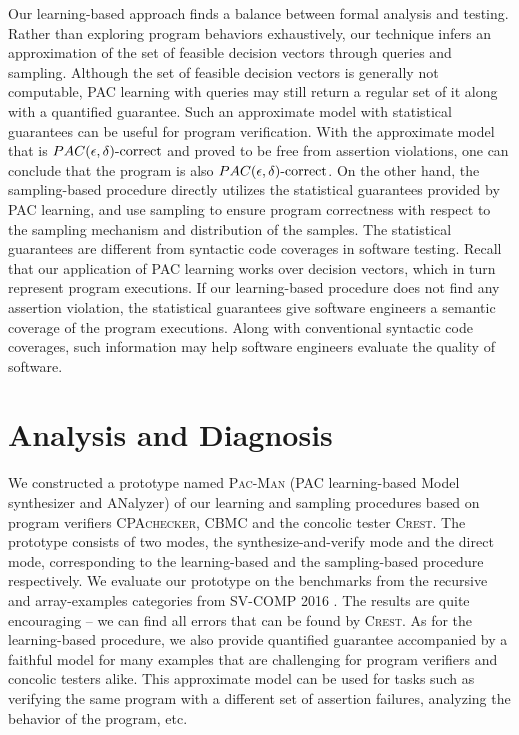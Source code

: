 Our learning-based approach finds a balance between formal analysis and testing. Rather than exploring program behaviors exhaustively, our technique infers an approximation of the set of feasible decision vectors through queries and sampling. Although the set of feasible decision vectors is generally not computable, PAC learning with queries may still return a regular set of it along with a quantified guarantee. Such an approximate model with statistical guarantees can be useful for program verification. With the approximate model that is $PAC(\epsilon, \delta)\text{-correct}$ and proved to be free from assertion violations, one can conclude that the program is also $PAC(\epsilon, \delta)\text{-correct}$. On the other hand, the sampling-based procedure directly utilizes the statistical guarantees provided by PAC learning, and use sampling to ensure program correctness with respect to the sampling mechanism and distribution of the samples. The statistical guarantees are different from syntactic code coverages in software testing. Recall that our application of PAC learning works over decision vectors, which in turn represent program executions. If our learning-based procedure does not find any assertion violation, the statistical guarantees give software engineers a semantic coverage of the program executions. Along with conventional syntactic code coverages, such information may help software engineers evaluate the quality of software.

\section{Analysis and Diagnosis}\label{sec:analysis_diagnosis}

We constructed a prototype named \textsc{Pac-Man} (PAC learning-based Model synthesizer and ANalyzer) of our learning and sampling procedures based on program verifiers \textsc{CPAchecker, CBMC} and the concolic tester \textsc{Crest}. The prototype consists of two modes, the synthesize-and-verify mode and the direct mode, corresponding to the learning-based and the sampling-based procedure respectively. We evaluate our prototype on the benchmarks from the recursive and  array-examples categories from SV-COMP 2016 \cite{svcomp16}. The results are quite encouraging -- we can find all errors that can be found by \textsc{Crest}. As for the learning-based procedure, we also provide quantified guarantee accompanied by a faithful model for many examples that are challenging for program verifiers and concolic testers alike. This approximate model can be used for tasks such as verifying the same program with a different set of assertion failures, analyzing the behavior of the program, etc. 

